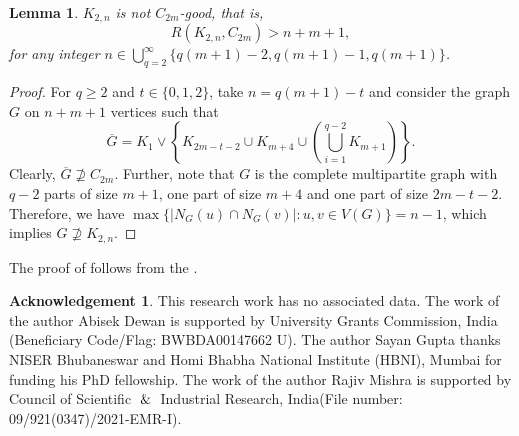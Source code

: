 \documentclass[12pt]{article}
\newtheorem{lemma}[theorem]{Lemma}
\theoremstyle{definition}
\newtheorem*{acknowledgement}{Acknowledgement}
\begin{document}
\begin{lemma}\label{lem:construction2}
    $K_{2,n}$ is not $C_{2m}$-good, that is,
    $$R(K_{2,n},C_{2m})>n+m+1,$$
    for any integer $n\in \bigcup_{q=2}^{\infty}\{q(m+1)-2,q(m+1)-1,q(m+1)\}$.
\end{lemma}
\begin{proof}
For $q\geq 2$ and $t\in\{0,1,2\}$, take $n=q(m+1)-t$ and consider the graph $G$ on $n+m+1$ vertices such that 
    $$\overline{G}=K_1\vee \left\{K_{2m-t-2}\cup K_{m+4}\cup\left(\bigcup_{i=1}^{q-2}K_{m+1} \right)\right\}.$$
    Clearly, $\overline{G}\nsupseteq C_{2m}$. Further, note that $G$ is the complete multipartite graph with $q-2$ parts of size $m+1$, one part of size $m+4$ and one part of size $2m-t-2$. Therefore, we have  $\max\{|N_G(u)\cap N_G(v)|: u,v\in V(G)\}=n-1$, which implies $G\nsupseteq K_{2,n}$.
\end{proof}

The proof of  follows from the .

\begin{acknowledgement}
This research work has no associated data. The work of the author Abisek Dewan is supported by University Grants Commission, India (Beneficiary Code/Flag: BWBDA00147662 U). The author Sayan Gupta thanks NISER Bhubaneswar and Homi Bhabha National Institute (HBNI), Mumbai for funding his PhD fellowship. The work of the author Rajiv Mishra is supported by Council of Scientific $\And$ Industrial Research, India(File number: 09/921(0347)/2021-EMR-I).  
\end{acknowledgement}



	
\end{document}

